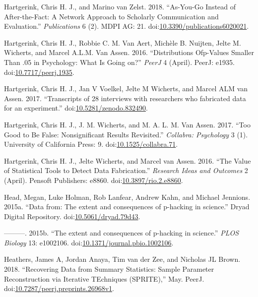 \documentclass[a5paper]{book}
\begin{document}
\hypertarget{ref-doi:10.3390ux2fpublications6020021}{}
Hartgerink, Chris H. J., and Marino van Zelst. 2018. ``As-You-Go Instead
of After-the-Fact: A Network Approach to Scholarly Communication and
Evaluation.'' \emph{Publications} 6 (2). MDPI AG: 21.
doi:\href{https://doi.org/10.3390/publications6020021}{10.3390/publications6020021}.

\hypertarget{ref-doi:10.7717ux2fpeerj.1935}{}
Hartgerink, Chris H. J., Robbie C. M. Van Aert, Michèle B. Nuijten,
Jelte M. Wicherts, and Marcel A.L.M. Van Assen. 2016. ``Distributions
Ofp-Values Smaller Than .05 in Psychology: What Is Going on?''
\emph{PeerJ} 4 (April). PeerJ: e1935.
doi:\href{https://doi.org/10.7717/peerj.1935}{10.7717/peerj.1935}.

\hypertarget{ref-doi:10.5281ux2fzenodo.832490}{}
Hartgerink, Chris H. J., Jan V Voelkel, Jelte M Wicherts, and Marcel ALM
van Assen. 2017. ``Transcripts of 28 interviews with researchers who
fabricated data for an experiment.''
doi:\href{https://doi.org/10.5281/zenodo.832490}{10.5281/zenodo.832490}.

\hypertarget{ref-doi:10.1525ux2fcollabra.71}{}
Hartgerink, Chris H. J., J. M. Wicherts, and M. A. L. M. Van Assen.
2017. ``Too Good to Be False: Nonsignificant Results Revisited.''
\emph{Collabra: Psychology} 3 (1). University of California Press: 9.
doi:\href{https://doi.org/10.1525/collabra.71}{10.1525/collabra.71}.

\hypertarget{ref-doi:10.3897ux2frio.2.e8860}{}
Hartgerink, Chris H. J., Jelte Wicherts, and Marcel van Assen. 2016.
``The Value of Statistical Tools to Detect Data Fabrication.''
\emph{Research Ideas and Outcomes} 2 (April). Pensoft Publishers: e8860.
doi:\href{https://doi.org/10.3897/rio.2.e8860}{10.3897/rio.2.e8860}.

\hypertarget{ref-doi:10.5061ux2fdryad.79d43}{}
Head, Megan, Luke Holman, Rob Lanfear, Andrew Kahn, and Michael
Jennions. 2015a. ``Data from: The extent and consequences of p-hacking
in science.'' Dryad Digital Repository.
doi:\href{https://doi.org/10.5061/dryad.79d43}{10.5061/dryad.79d43}.

\hypertarget{ref-doi:10.1371ux2fjournal.pbio.1002106}{}
---------. 2015b. ``The extent and consequences of p-hacking in
science.'' \emph{PLOS Biology} 13: e1002106.
doi:\href{https://doi.org/10.1371/journal.pbio.1002106}{10.1371/journal.pbio.1002106}.

\hypertarget{ref-doi:10.7287ux2fpeerj.preprints.26968v1}{}
Heathers, James A, Jordan Anaya, Tim van der Zee, and Nicholas JL Brown.
2018. ``Recovering Data from Summary Statistics: Sample Parameter
Reconstruction via Iterative TEchniques (SPRITE),'' May. PeerJ.
doi:\href{https://doi.org/10.7287/peerj.preprints.26968v1}{10.7287/peerj.preprints.26968v1}.
\end{document}
